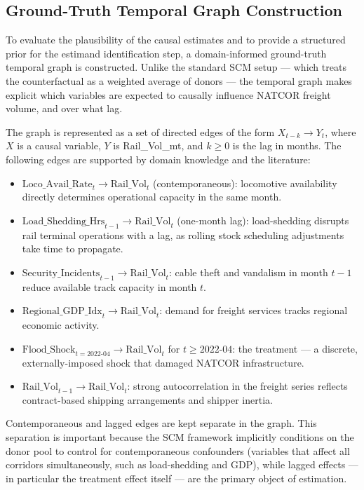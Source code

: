 \subsection{Ground-Truth Temporal Graph Construction}
\label{sec:groundtruth}

To evaluate the plausibility of the causal estimates and to provide
a structured prior for the estimand identification step, a
domain-informed ground-truth temporal graph is constructed.
Unlike the standard SCM setup --- which treats the counterfactual
as a weighted average of donors --- the temporal graph makes explicit
which variables are expected to causally influence NATCOR freight
volume, and over what lag.

The graph is represented as a set of directed edges of the form
$X_{t-k} \to Y_t$, where $X$ is a causal variable, $Y$ is
Rail\_Vol\_mt, and $k \geq 0$ is the lag in months.
The following edges are supported by domain knowledge and the
literature:

\begin{itemize}
  \item $\text{Loco\_Avail\_Rate}_{t} \to \text{Rail\_Vol}_{t}$
        (contemporaneous): locomotive availability directly
        determines operational capacity in the same month.
  \item $\text{Load\_Shedding\_Hrs}_{t-1} \to \text{Rail\_Vol}_{t}$
        (one-month lag): load-shedding disrupts rail terminal
        operations with a lag, as rolling stock scheduling adjustments
        take time to propagate.
  \item $\text{Security\_Incidents}_{t-1} \to \text{Rail\_Vol}_{t}$:
        cable theft and vandalism in month $t-1$ reduce available
        track capacity in month $t$.
  \item $\text{Regional\_GDP\_Idx}_{t} \to \text{Rail\_Vol}_{t}$:
        demand for freight services tracks regional economic activity.
  \item $\text{Flood\_Shock}_{t=\text{2022-04}} \to
        \text{Rail\_Vol}_{t}$ for $t \geq \text{2022-04}$:
        the treatment --- a discrete, externally-imposed shock
        that damaged NATCOR infrastructure.
  \item $\text{Rail\_Vol}_{t-1} \to \text{Rail\_Vol}_{t}$:
        strong autocorrelation in the freight series reflects
        contract-based shipping arrangements and shipper inertia.
\end{itemize}

Contemporaneous and lagged edges are kept separate in the graph.
This separation is important because the SCM framework implicitly
conditions on the donor pool to control for contemporaneous
confounders (variables that affect all corridors simultaneously,
such as load-shedding and GDP), while lagged effects --- in particular
the treatment effect itself --- are the primary object of estimation.

